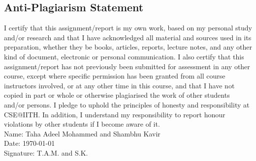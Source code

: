 \documentclass[conference]{IEEEtran}
\begin{document}
\subsection*{Anti-Plagiarism Statement}
I certify that this assignment/report is my own work, based on my personal study and/or research and that I have acknowledged all material and sources used in its preparation, whether they be books, articles, reports, lecture notes, and any other kind of document, electronic or personal communication. I also certify that this assignment/report has not previously been submitted for assessment in any other course, except where specific permission has been granted from all course instructors involved, or at any other time in this course, and that I have not copied in part or whole or otherwise plagiarised the work of other students and/or persons. I pledge to uphold the principles of honesty and responsibility at CSE@IITH. In addition, I understand my responsibility to report honour violations by other students if I become aware of it.\\

\noindent
Name: Taha Adeel Mohammed and Shambhu Kavir \\
Date: \today \\
Signature: T.A.M. and S.K.
\end{document}
